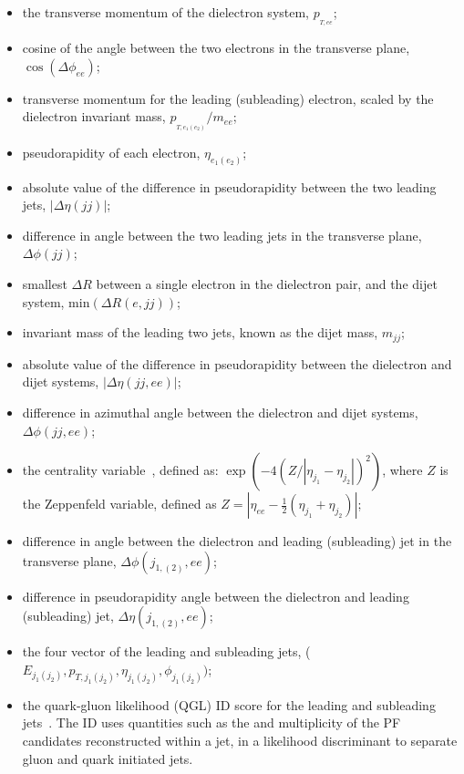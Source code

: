 \begin{itemize}
    \item the transverse momentum of the dielectron system, $p_{{_{T,ee}}}$;
    \item cosine of the angle between the two electrons in the transverse plane, $\cos(\Delta\phi_{ee})$;
    \item transverse momentum for the leading (subleading) electron, scaled by the dielectron invariant mass, $p_{_{T, e_1(e_2)}}/m_{ee}$;
    \item pseudorapidity of each electron, $\eta_{e_1(e_2)}$;
    \item absolute value of the difference in pseudorapidity between the two leading jets, $|\Delta\eta(jj)|$;
    \item difference in angle between the two leading jets in the transverse plane, $\Delta\phi(jj)$;
    \item smallest $\Delta R$ between a single electron in the dielectron pair, and the dijet system, $\mathrm{min}(\Delta R(e,jj))$;
    \item invariant mass of the leading two jets, known as the dijet mass, $m_{jj}$;
    \item absolute value of the difference in pseudorapidity between the dielectron and dijet systems, $|\Delta\eta(jj,ee)|$;
    \item difference in azimuthal angle between the dielectron and dijet systems, $\Delta\phi(jj,ee)$;
    \item the centrality variable~\cite{Zeppenfeld}, defined as: $\exp(-4(Z/|\eta_{j_{1}}-\eta_{j_{2}}|)^2)$, where $Z$ is the Zeppenfeld variable, defined as $Z=|\eta_{ee} - \frac{1}{2}(\eta_{j_{1}}+\eta_{j_{2}})|$;
    \item difference in angle between the dielectron and leading (subleading) jet in the transverse plane, $\Delta\phi(j_{1, (2)},ee)$;
    \item difference in pseudorapidity angle between the dielectron and leading (subleading) jet, $\Delta\eta(j_{1, (2)},ee)$;
    \item the four vector of the leading and subleading jets, ($E_{j_{1}(j_{2})}, p_{T, j_{1}(j_{2})}, \eta_{j_{1}(j_{2})}, \phi_{j_{1}(j_{2})})$;
    \item the quark-gluon likelihood (QGL) ID score for the leading and subleading jets~\cite{JetsInRun2}. The ID uses quantities such as the \pt and multiplicity of the PF candidates reconstructed within a jet, in a likelihood discriminant to separate gluon and quark initiated jets.
\end{itemize}


